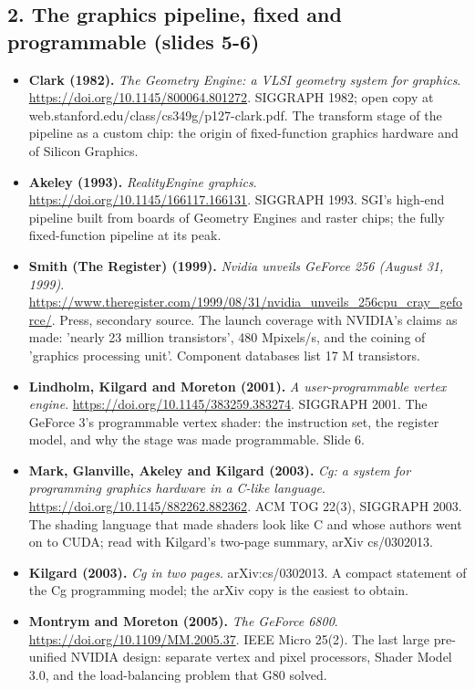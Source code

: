 \subsection*{2. The graphics pipeline, fixed and programmable (slides 5-6)}
\begin{itemize}[leftmargin=1.2em,itemsep=3pt]\sloppy
\item \textbf{Clark (1982).} \textit{The Geometry Engine: a VLSI geometry system for graphics}. \url{https://doi.org/10.1145/800064.801272}. SIGGRAPH 1982; open copy at web.stanford.edu/class/cs349g/p127-clark.pdf. The transform stage of the pipeline as a custom chip: the origin of fixed-function graphics hardware and of Silicon Graphics.
\item \textbf{Akeley (1993).} \textit{RealityEngine graphics}. \url{https://doi.org/10.1145/166117.166131}. SIGGRAPH 1993. SGI's high-end pipeline built from boards of Geometry Engines and raster chips; the fully fixed-function pipeline at its peak.
\item \textbf{Smith (The Register) (1999).} \textit{Nvidia unveils GeForce 256 (August 31, 1999)}. \url{https://www.theregister.com/1999/08/31/nvidia_unveils_256cpu_cray_geforce/}. Press, secondary source. The launch coverage with NVIDIA's claims as made: 'nearly 23 million transistors', 480 Mpixels/s, and the coining of 'graphics processing unit'. Component databases list 17 M transistors.
\item \textbf{Lindholm, Kilgard and Moreton (2001).} \textit{A user-programmable vertex engine}. \url{https://doi.org/10.1145/383259.383274}. SIGGRAPH 2001. The GeForce 3's programmable vertex shader: the instruction set, the register model, and why the stage was made programmable. Slide 6.
\item \textbf{Mark, Glanville, Akeley and Kilgard (2003).} \textit{Cg: a system for programming graphics hardware in a C-like language}. \url{https://doi.org/10.1145/882262.882362}. ACM TOG 22(3), SIGGRAPH 2003. The shading language that made shaders look like C and whose authors went on to CUDA; read with Kilgard's two-page summary, arXiv cs/0302013.
\item \textbf{Kilgard (2003).} \textit{Cg in two pages}. arXiv:cs/0302013. A compact statement of the Cg programming model; the arXiv copy is the easiest to obtain.
\item \textbf{Montrym and Moreton (2005).} \textit{The GeForce 6800}. \url{https://doi.org/10.1109/MM.2005.37}. IEEE Micro 25(2). The last large pre-unified NVIDIA design: separate vertex and pixel processors, Shader Model 3.0, and the load-balancing problem that G80 solved.

\end{itemize}
